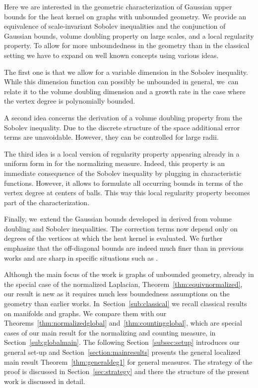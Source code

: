 \documentclass[JEP,XML,SOM,Unicode,published]{cedram}
\theoremstyle{plain}
\theoremstyle{definition}
\begin{document}
Here we are interested in the geometric characterization of Gaussian upper bounds for the heat kernel on graphs with unbounded geometry.
We provide an equivalence of scale-invariant
Sobolev inequalities and the conjunction of Gaussian bounds, volume doubling property on large scales, and a local regularity property.
To allow for more unboundedness in the geometry than in the classical setting we have to expand on well known concepts using various ideas.

The first one is that we allow for a variable dimension in the Sobolev inequality. While this dimension function can possibly be unbounded in general, we~can relate it to the volume doubling dimension and a growth rate in the case where the vertex degree is polynomially bounded.

A second idea concerns the derivation of a volume doubling property from the Sobolev inequality. Due to the discrete structure of the space additional error terms are unavoidable. However, they can be controlled for large radii.

The third idea is a local version of regularity property appearing already in a uniform form in \cite{BarlowChen-16} for the normalizing measure. Indeed, this property is an immediate consequence of the Sobolev inequality by plugging in characteristic functions. However, it allows to formulate all occurring bounds in terms of the vertex degree at centers of balls. This way this local regularity property becomes part of the characterization.

Finally, we~extend the Gaussian bounds developed in \cite{KellerRose-22a} derived from volume doubling and Sobolev inequalities. The correction terms now depend only on degrees of the vertices at which the heat kernel is evaluated. We further emphasize that the off-diagonal bounds are indeed much finer than in previous works and are sharp in specific situations such as \cite{Davies-93,Pang-93}.

Although the main focus of the work is graphs of unbounded geometry, already in the special case of the normalized Laplacian, Theorem~\ref{thm:equivnormalized}, our result is new as it requires much less boundedness assumptions on the geometry than earlier works.
In~Section~\ref{sub:classical} we recall classical results on manifolds and graphs. We compare them with our Theorems~\ref{thm:normalizedglobal} and~\ref{thm:countingglobal}, which are special cases of our main result for the normalizing and counting measure, in Section~\ref{sub:globalmain}. The following Section~\ref{subsec:setup} introduces our general set-up and Section~\ref{section:mainresults} presents the general localized main result Theorem~\ref{thm:generaldeg1} for general measures. The strategy of the proof is discussed in Section~\ref{sec:strategy} and there the structure of the present work is discussed in detail.
\end{document}
